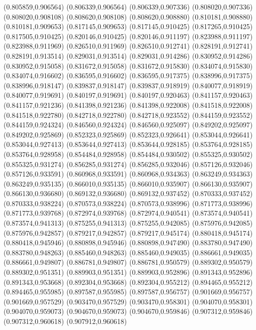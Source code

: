 (0.805859,0.906564)
(0.806339,0.906564)
(0.806339,0.907336)
(0.808020,0.907336)
(0.808020,0.908108)
(0.808620,0.908108)
(0.808620,0.908880)
(0.810181,0.908880)
(0.810181,0.909653)
(0.817145,0.909653)
(0.817145,0.910425)
(0.817265,0.910425)
(0.817505,0.910425)
(0.820146,0.910425)
(0.820146,0.911197)
(0.823988,0.911197)
(0.823988,0.911969)
(0.826510,0.911969)
(0.826510,0.912741)
(0.828191,0.912741)
(0.828191,0.913514)
(0.829031,0.913514)
(0.829031,0.914286)
(0.830952,0.914286)
(0.830952,0.915058)
(0.831672,0.915058)
(0.831672,0.915830)
(0.834074,0.915830)
(0.834074,0.916602)
(0.836595,0.916602)
(0.836595,0.917375)
(0.838996,0.917375)
(0.838996,0.918147)
(0.839837,0.918147)
(0.839837,0.918919)
(0.840077,0.918919)
(0.840077,0.919691)
(0.840197,0.919691)
(0.840197,0.920463)
(0.841157,0.920463)
(0.841157,0.921236)
(0.841398,0.921236)
(0.841398,0.922008)
(0.841518,0.922008)
(0.841518,0.922780)
(0.842718,0.922780)
(0.842718,0.923552)
(0.844159,0.923552)
(0.844159,0.924324)
(0.846560,0.924324)
(0.846560,0.925097)
(0.849202,0.925097)
(0.849202,0.925869)
(0.852323,0.925869)
(0.852323,0.926641)
(0.853044,0.926641)
(0.853044,0.927413)
(0.853644,0.927413)
(0.853644,0.928185)
(0.853764,0.928185)
(0.853764,0.928958)
(0.854484,0.928958)
(0.854484,0.930502)
(0.855325,0.930502)
(0.855325,0.931274)
(0.856285,0.931274)
(0.856285,0.932046)
(0.857126,0.932046)
(0.857126,0.933591)
(0.860968,0.933591)
(0.860968,0.934363)
(0.863249,0.934363)
(0.863249,0.935135)
(0.866010,0.935135)
(0.866010,0.935907)
(0.866130,0.935907)
(0.866130,0.936680)
(0.869132,0.936680)
(0.869132,0.937452)
(0.870333,0.937452)
(0.870333,0.938224)
(0.870573,0.938224)
(0.870573,0.938996)
(0.871773,0.938996)
(0.871773,0.939768)
(0.872974,0.939768)
(0.872974,0.940541)
(0.873574,0.940541)
(0.873574,0.941313)
(0.875255,0.941313)
(0.875255,0.942085)
(0.875976,0.942085)
(0.875976,0.942857)
(0.879217,0.942857)
(0.879217,0.945174)
(0.880418,0.945174)
(0.880418,0.945946)
(0.880898,0.945946)
(0.880898,0.947490)
(0.883780,0.947490)
(0.883780,0.948263)
(0.885460,0.948263)
(0.885460,0.949035)
(0.886661,0.949035)
(0.886661,0.949807)
(0.886781,0.949807)
(0.886781,0.950579)
(0.889302,0.950579)
(0.889302,0.951351)
(0.889903,0.951351)
(0.889903,0.952896)
(0.891343,0.952896)
(0.891343,0.953668)
(0.892304,0.953668)
(0.892304,0.955212)
(0.894465,0.955212)
(0.894465,0.955985)
(0.897587,0.955985)
(0.897587,0.956757)
(0.901669,0.956757)
(0.901669,0.957529)
(0.903470,0.957529)
(0.903470,0.958301)
(0.904070,0.958301)
(0.904070,0.959073)
(0.904670,0.959073)
(0.904670,0.959846)
(0.907312,0.959846)
(0.907312,0.960618)
(0.907912,0.960618)
